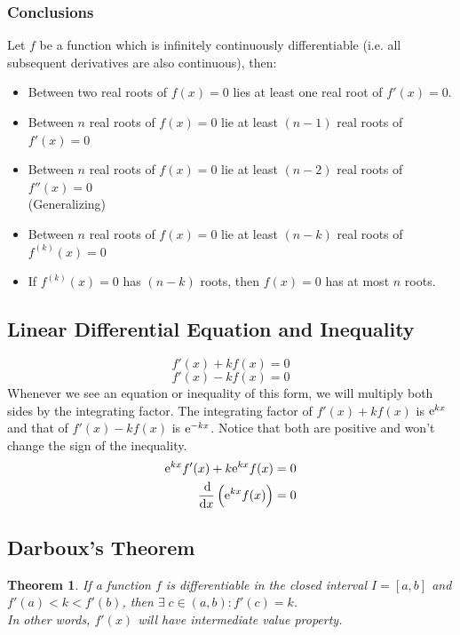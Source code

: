 \documentclass[14]{article}
\newtheorem{theorem}{Theorem}
\theoremstyle{definition}
\begin{document}
\subsubsection{Conclusions}
Let $f$ be a function which is infinitely continuously differentiable (i.e. all subsequent derivatives are also continuous), then:
\begin{itemize}
\item Between two real roots of $f(x) = 0$ lies at least one real root of $f'(x) = 0$.
\item Between $n$ real roots of $f(x) = 0$ lie at least $(n - 1)$ real roots of $f'(x) = 0$
\item Between $n$ real roots of $f(x) = 0$ lie at least $(n - 2)$ real roots of $f''(x) = 0$\\
(Generalizing)
\item Between $n$ real roots of $f(x) = 0$ lie at least $(n - k)$ real roots of $f^{(k)}(x) = 0$
\item If $f^{(k)}(x) = 0$ has $(n - k)$ roots, then $f(x) = 0$ has at most $n$ roots.
\end{itemize}
\subsection{Linear Differential Equation and Inequality}
\[f'(x) + k f(x) = 0\]
\[f'(x) - k f(x) = 0\]
Whenever we see an equation or inequality of this form, we will multiply both sides by the integrating factor. The integrating factor of $f'(x) + k f(x)$ is ${\rm e}^{kx}$ and that of $f'(x) - k f(x)$ is ${\rm e}^{-kx}$. Notice that both are positive and won't change the sign of the inequality.
\begin{align*}
{\rm e}^{kx}f'(x) + k {\rm e}^{kx} f(x) = 0\\
\dfrac{\dif}{\dif x}\left({\rm e}^{kx} f(x)\right) = 0
\end{align*}
\pagebreak
\subsection{Darboux's Theorem}
\begin{theorem}
If a function $f$ is differentiable in the closed interval $I = [a, b]$ and $f'(a) < k < f'(b)$, then $\exists \; c \in (a, b) : f'(c) = k$.\\
In other words, $f'(x)$ will have intermediate value property.
\end{theorem}
\end{document}
